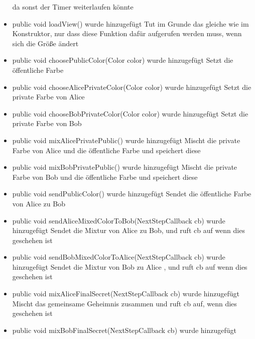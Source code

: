 \documentclass{article}
\begin{document}
\begin{itemize}
               da sonst der Timer weiterlaufen könnte
           \item public void loadView() wurde hinzugefügt\newline
               Tut im Grunde das gleiche wie im Konstruktor, nur dass diese Funktion dafür
               aufgerufen werden muss, wenn sich die Größe ändert
           \item public void choosePublicColor(Color color) wurde hinzugefügt\newline
               Setzt die öffentliche Farbe
           \item public void chooseAlicePrivateColor(Color color) wurde hinzugefügt\newline
               Setzt die private Farbe von Alice
           \item public void chooseBobPrivateColor(Color color) wurde hinzugefügt\newline
               Setzt die private Farbe von Bob
           \item public void mixAlicePrivatePublic() wurde hinzugefügt\newline
               Mischt die private Farbe von Alice und die öffentliche Farbe
               und speichert diese
           \item public void mixBobPrivatePublic() wurde hinzugefügt\newline
               Mischt die private Farbe von Bob und die öffentliche Farbe
               und speichert diese
           \item public void sendPublicColor() wurde hinzugefügt\newline
               Sendet die öffentliche Farbe von Alice zu Bob
           \item public void sendAliceMixedColorToBob(NextStepCallback cb) wurde hinzugefügt\newline
               Sendet die Mixtur von Alice zu Bob, und ruft cb auf wenn dies geschehen ist
           \item public void sendBobMixedColorToAlice(NextStepCallback cb) wurde hinzugefügt\newline
               Sendet die Mixtur von Bob zu Alice , und ruft cb auf wenn dies geschehen ist
           \item public void mixAliceFinalSecret(NextStepCallback cb) wurde hinzugefügt\newline
               Mischt das gemeinsame Geheimnis zusammen und ruft cb auf, wenn dies geschehen ist
           \item public void mixBobFinalSecret(NextStepCallback cb) wurde hinzugefügt\newline

\end{itemize}
\end{document}
